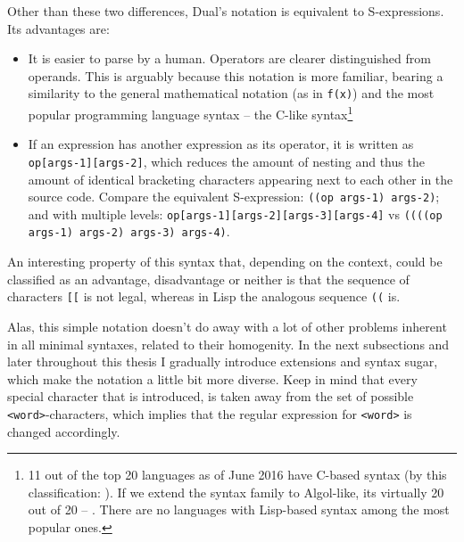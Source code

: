 Other than these two differences, Dual's notation is equivalent to S-expressions. Its advantages are:
\begin{itemize}
    \item It is easier to parse by a human. Operators are clearer distinguished from operands. This is arguably because this notation is more familiar, bearing a similarity to the general mathematical notation (as in \texttt{f(x)}) and the most popular programming language syntax -- the C-like syntax\footnote{11 out of the
        top 20 languages as of June 2016\cite{tiobe} have C-based syntax (by this classification: \cite{c_family_list_wikipedia}). If
        we extend the syntax family to Algol-like, its virtually 20 out of 20 --
        \cite{pl_genealogy}. There are no languages with Lisp-based syntax among the most popular ones.}
    \item If an expression has another expression as its operator, it is written
      as \texttt{op[args-1][args-2]}, which reduces the amount of nesting and
      thus the amount of identical bracketing characters appearing next to each other in the source code. Compare the equivalent S-expression: \texttt{((op args-1) args-2)}; and with multiple levels:
      \texttt{op[args-1][args-2][args-3][args-4]} vs \texttt{((((op args-1)
        args-2) args-3) args-4)}.
\end{itemize}

An interesting property of this syntax that, depending on the context, could be
classified as an advantage, disadvantage or neither is that the sequence of
characters \texttt{[[} is not legal, whereas in Lisp the analogous sequence \texttt{((} is.

Alas, this simple notation doesn't do away with a lot of other problems inherent
in all minimal syntaxes, related to their homogenity. In the next subsections and later throughout this thesis I gradually introduce extensions and syntax sugar, which make the notation a little bit more diverse. Keep in mind that every special character that is introduced, is taken away from the set of possible \texttt{<word>}-characters, which implies that the regular expression for \texttt{<word>} is changed accordingly.

